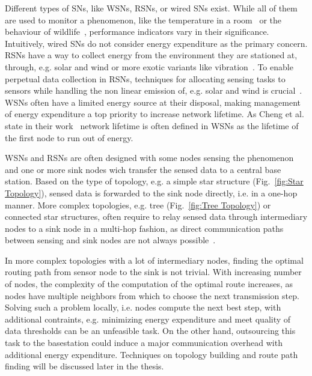 Different types of \acp{SN}, like \acp{WSN}, \acp{RSN}, or wired \acp{SN}
exist. While all of them are used to monitor a phenomenon, like the temperature
in a room~\cite{labdata} or the behaviour of
wildlife~\cite{bennett2011cranetracker}, performance indicators vary in their
significance. Intuitively, wired \acp{SN} do not consider energy expenditure as
the primary concern. \acp{RSN} have a way to collect energy from the
environment they are stationed at, through, e.g. solar and wind or more exotic
variants like vibration~\cite{perpetuum}. To enable perpetual data collection
in \acp{RSN}, techniques for allocating sensing tasks to sensors while handling
the non linear emission of, e.g. solar and wind is
crucial~\cite{liu2011perpetual}. \acp{WSN} often have a limited energy source
at their disposal, making management of energy expenditure a top priority to
increase network lifetime. As Cheng et al. state in their
work~\cite{cheng2013stcdg} network lifetime is often defined in \acp{WSN} as
the lifetime of the first node to run out of energy. 
\par
\acp{WSN} and \acp{RSN} are often designed with some nodes sensing the
phenomenon and one or more sink nodes wich transfer the sensed data to a
central base station. Based on the type of topology, e.g. a simple star
structure (Fig.~\ref{fig:Star Topology}), sensed data is forwarded to the sink
node directly, i.e. in a one-hop manner. More complex topologies, e.g. tree
(Fig.~\ref{fig:Tree Topology}) or connected star structures, often require to
relay sensed data through intermediary nodes to a sink node in a multi-hop
fashion, as direct communication paths between sensing and sink nodes are not
always possible~\cite{romer2004design}. 
\par
In more complex topologies with a lot of intermediary nodes, finding the
optimal routing path from sensor node to the sink is not trivial. With
increasing number of nodes, the complexity of the computation of the optimal
route increases, as nodes have multiple neighbors from which to choose the next
transmission step. Solving such a problem locally, i.e. nodes compute the next
best step, with additional contraints, e.g. minimizing energy expenditure and
meet quality of data thresholds can be an unfeasible task. On the other hand,
outsourcing this task to the basestation could induce a major communication
overhead with additional energy expenditure. Techniques on topology building
and route path finding will be discussed later in the thesis.

